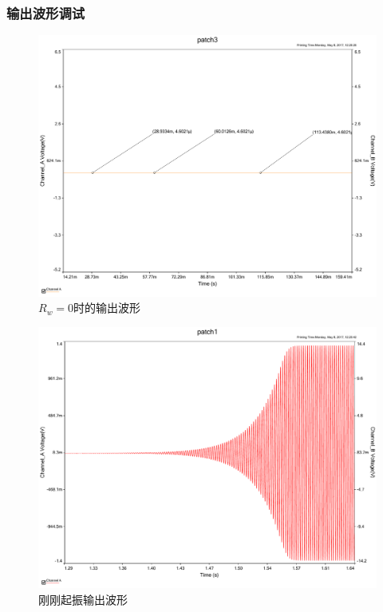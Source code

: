 \documentclass[UTF8,a4paper]{paper}
\begin{document}
\subsubsection{输出波形调试}
\begin {figure}[H]
\includegraphics [width=\textwidth]{0ac.pdf}
\caption{$R_w=0$时的输出波形}
\label{AC0}
\end {figure}
\begin {figure}[H]
\centering
\includegraphics [width=\textwidth]{startac.pdf}
\caption{刚刚起振输出波形}
\label{ACstart}
\end {figure}
\end{document}
